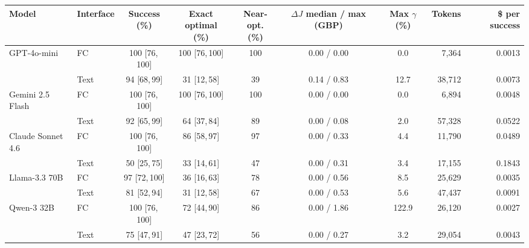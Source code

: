 \begin{tabular}{llcccccrr}
\toprule
Model & Interface & \makecell{Success\\(\%)} & \makecell{Exact optimal\\(\%)} & \makecell{Near-opt.\\(\%)} & \makecell{$\Delta J$ median / max\\(GBP)} & \makecell{Max $\gamma$\\(\%)} & Tokens & \makecell{\$ per\\success} \\
\midrule
GPT-4o-mini & FC & 100 [76,\,100] & 100 [76,\,100] & 100 & 0.00 / 0.00 & 0.0 & 7,364 & 0.0013 \\
 & Text & 94 [68,\,99] & 31 [12,\,58] & 39 & 0.14 / 0.83 & 12.7 & 38,712 & 0.0073 \\
Gemini 2.5 Flash & FC & 100 [76,\,100] & 100 [76,\,100] & 100 & 0.00 / 0.00 & 0.0 & 6,894 & 0.0048 \\
 & Text & 92 [65,\,99] & 64 [37,\,84] & 89 & 0.00 / 0.08 & 2.0 & 57,328 & 0.0522 \\
Claude Sonnet 4.6 & FC & 100 [76,\,100] & 86 [58,\,97] & 97 & 0.00 / 0.33 & 4.4 & 11,790 & 0.0489 \\
 & Text & 50 [25,\,75] & 33 [14,\,61] & 47 & 0.00 / 0.31 & 3.4 & 17,155 & 0.1843 \\
\midrule
Llama-3.3 70B & FC & 97 [72,\,100] & 36 [16,\,63] & 78 & 0.00 / 0.56 & 8.5 & 25,629 & 0.0035 \\
 & Text & 81 [52,\,94] & 31 [12,\,58] & 67 & 0.00 / 0.53 & 5.6 & 47,437 & 0.0091 \\
Qwen-3 32B & FC & 100 [76,\,100] & 72 [44,\,90] & 86 & 0.00 / 1.86 & 122.9 & 26,120 & 0.0027 \\
 & Text & 75 [47,\,91] & 47 [23,\,72] & 56 & 0.00 / 0.27 & 3.2 & 29,054 & 0.0043 \\
\bottomrule
\end{tabular}
